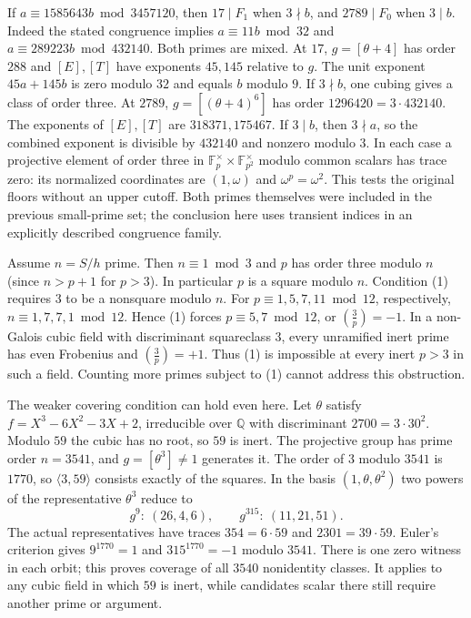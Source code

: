 \documentclass[11pt,a4paper,oneside,openany]{book}
\newcommand{\Q}{\mathbb Q}\newcommand{\C}{\mathbb C}\newcommand{\Z}{\mathbb Z}\newcommand{\F}{\mathbb F}\newcommand{\Tr}{\operatorname{Tr}}\newcommand{\Nm}{\operatorname{N}}\newcommand{\ord}{\operatorname{ord}}\newcommand{\K}{K}\newcommand{\OO}{\mathcal O_K}\newcommand{\unit}{\mathcal U}
\begin{document}
If $a\equiv1585643b\bmod3457120$, then $17\mid F_1$ when $3\nmid b$, and $2789\mid F_0$ when $3\mid b$. Indeed the stated congruence implies $a\equiv11b\bmod32$ and $a\equiv289223b\bmod432140$. Both primes are mixed. At $17$, $g=[\theta+4]$ has order $288$ and $[E],[T]$ have exponents $45,145$ relative to $g$. The unit exponent $45a+145b$ is zero modulo $32$ and equals $b$ modulo $9$. If $3\nmid b$, one cubing gives a class of order three. At $2789$, $g=[(\theta+4)^6]$ has order $1296420=3\cdot432140$. The exponents of $[E],[T]$ are $318371,175467$. If $3\mid b$, then $3\nmid a$, so the combined exponent is divisible by $432140$ and nonzero modulo $3$. In each case a projective element of order three in $\F_p^\times\times\F_{p^2}^\times$ modulo common scalars has trace zero: its normalized coordinates are $(1,\omega)$ and $\omega^p=\omega^2$. This tests the original floors without an upper cutoff. Both primes themselves were included in the previous small-prime set; the conclusion here uses transient indices in an explicitly described congruence family.


Assume $n=S/h$ prime. Then $n\equiv1\bmod3$ and $p$ has order three modulo $n$ (since $n>p+1$ for $p>3$). In particular $p$ is a square modulo $n$. Condition (1) requires $3$ to be a nonsquare modulo $n$. For $p\equiv1,5,7,11\bmod12$, respectively, $n\equiv1,7,7,1\bmod12$. Hence (1) forces $p\equiv 5,7\bmod12$, or $\left(\frac3p\right)=-1$. In a non-Galois cubic field with discriminant squareclass $3$, every unramified inert prime has even Frobenius and $\left(\frac3p\right)=+1$. Thus (1) is impossible at every inert $p>3$ in such a field. Counting more primes subject to (1) cannot address this obstruction.

The weaker covering condition can hold even here. Let $\theta$ satisfy $f=X^3-6X^2-3X+2$, irreducible over $\Q$ with discriminant $2700=3\cdot30^2$. Modulo $59$ the cubic has no root, so $59$ is inert. The projective group has prime order $n=3541$, and $g=[\theta^3]\ne1$ generates it. The order of $3$ modulo $3541$ is $1770$, so $\langle3,59\rangle$ consists exactly of the squares. In the basis $(1,\theta,\theta^2)$ two powers of the representative $\theta^3$ reduce to
\[
 g^9:\ (26,4,6),\qquad g^{315}:\ (11,21,51).
\]
The actual representatives have traces $354=6\cdot59$ and $2301=39\cdot59$. Euler's criterion gives $9^{1770}=1$ and $315^{1770}=-1$ modulo $3541$. There is one zero witness in each orbit; this proves coverage of all $3540$ nonidentity classes. It applies to any cubic field in which $59$ is inert, while candidates scalar there still require another prime or argument.
\end{document}
